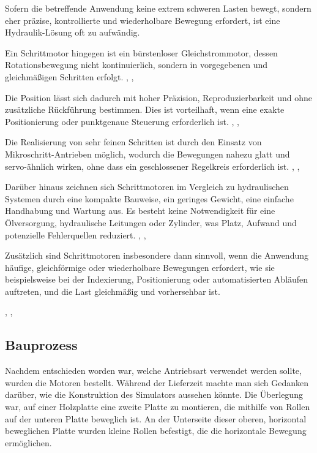 Sofern die betreffende Anwendung keine extrem schweren Lasten bewegt, sondern eher präzise, kontrollierte und wiederholbare Bewegung erfordert, ist eine Hydraulik-Lösung oft zu aufwändig.

Ein Schrittmotor hingegen ist ein bürstenloser Gleichstrommotor, dessen Rotationsbewegung nicht kontinuierlich, sondern in vorgegebenen und gleichmäßigen Schritten erfolgt.
\cite{KEM2021}, \cite{Nanotec2024}, \cite{RestonCondit2004}


Die Position lässt sich dadurch mit hoher Präzision, Reproduzierbarkeit und ohne zusätzliche Rückführung bestimmen. Dies ist vorteilhaft, wenn eine exakte Positionierung oder punktgenaue Steuerung erforderlich ist.
\cite{KEM2021}, \cite{Nanotec2024}, \cite{RestonCondit2004}


Die Realisierung von sehr feinen Schritten ist durch den Einsatz von Mikroschritt-Antrieben möglich, wodurch die Bewegungen nahezu glatt und servo-ähnlich wirken, ohne dass ein geschlossener Regelkreis erforderlich ist.
\cite{KEM2021}, \cite{Nanotec2024}, \cite{RestonCondit2004}

Darüber hinaus zeichnen sich Schrittmotoren im Vergleich zu hydraulischen Systemen durch eine kompakte Bauweise, ein geringes Gewicht, eine einfache Handhabung und Wartung aus. Es besteht keine Notwendigkeit für eine Ölversorgung, hydraulische Leitungen oder Zylinder, was Platz, Aufwand und potenzielle Fehlerquellen 
reduziert. 
\cite{KEM2021}, \cite{Nanotec2024}, \cite{RestonCondit2004}

Zusätzlich sind Schrittmotoren insbesondere dann sinnvoll, wenn die Anwendung häufige, gleichförmige oder wiederholbare Bewegungen erfordert, wie sie beispielsweise bei der Indexierung, Positionierung oder automatisierten Abläufen auftreten, und die Last gleichmäßig und vorhersehbar ist.

\cite{KEM2021}, \cite{Nanotec2024}, \cite{RestonCondit2004}

\subsection{Bauprozess}
Nachdem entschieden worden war, welche Antriebsart verwendet werden sollte, wurden die Motoren bestellt. 
Während der Lieferzeit machte man sich Gedanken darüber, wie die Konstruktion des Simulators aussehen könnte. 
Die Überlegung war, auf einer Holzplatte eine zweite Platte zu montieren, die mithilfe von Rollen auf der 
unteren Platte beweglich ist. An der Unterseite dieser oberen, horizontal beweglichen Platte wurden kleine 
Rollen befestigt, die die horizontale Bewegung ermöglichen.


